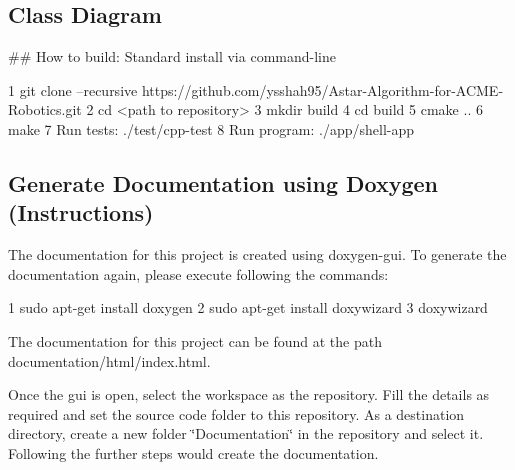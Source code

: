 \subsection*{Class Diagram}



\#\# How to build\+: Standard install via command-\/line 
\begin{DoxyCode}
1 git clone --recursive https://github.com/ysshah95/Astar-Algorithm-for-ACME-Robotics.git
2 cd <path to repository>
3 mkdir build
4 cd build
5 cmake ..
6 make
7 Run tests: ./test/cpp-test
8 Run program: ./app/shell-app
\end{DoxyCode}


\subsection*{Generate Documentation using Doxygen (Instructions)}

The documentation for this project is created using doxygen-\/gui. To generate the documentation again, please execute following the commands\+:


\begin{DoxyCode}
1 sudo apt-get install doxygen
2 sudo apt-get install doxywizard
3 doxywizard
\end{DoxyCode}


The documentation for this project can be found at the path {\ttfamily documentation/html/index.\+html}.

Once the gui is open, select the workspace as the repository. Fill the details as required and set the source code folder to this repository. As a destination directory, create a new folder \char`\"{}\+Documentation\char`\"{} in the repository and select it. Following the further steps would create the documentation. 